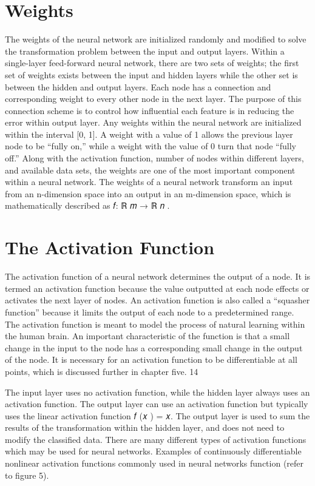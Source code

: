 \documentclass[../main.tex]{subfiles}
\begin{document}
    \section{Weights}\label{sec:weights}
    The weights of the neural network are initialized randomly and modified to solve the transformation problem between the input and output layers.
    Within a single-layer feed-forward neural network, there are two sets of weights; the first set of weights exists between the input and hidden layers while the other set is between the hidden and output layers.
    Each node has a connection and corresponding weight to every other node in the next layer.
    The purpose of this connection scheme is to control how influential each feature is in reducing the error within output layer.
    Any weights within the neural network are initialized within the interval [0, 1].
    A weight with a value of 1 allows the previous layer node to be “fully on,” while a weight with the value of 0 turn that node “fully off.” Along with the activation function, number of nodes within different layers, and available data sets, the weights are one of the most important component within a neural network.
    The weights of a neural network transform an input from an n-dimension space into an output in an m-dimension space, which is mathematically described as 𝑓: ℝ 𝑚 → ℝ 𝑛 .

    \section{The Activation Function}\label{sec:the-activation-function}
    The activation function of a neural network determines the output of a node.
    It is termed an activation function because the value outputted at each node effects or activates the next layer of nodes.
    An activation function is also called a “squasher function” because it limits the output of each node to a predetermined range.
    The activation function is meant to model the process of natural learning within the human brain.
    An important characteristic of the function is that a small change in the input to the node has a corresponding small change in the output of the node.
    It is necessary for an activation function to be differentiable at all points, which is discussed further in chapter five. 14

    The input layer uses no activation function, while the hidden layer always uses an activation function.
    The output layer can use an activation function but typically uses the linear activation function 𝑓 (𝑥 ) = 𝑥.
    The output layer is used to sum the results of the transformation within the hidden layer, and does not need to modify the classified data.
    There are many different types of activation functions which may be used for neural networks.
    Examples of continuously differentiable nonlinear activation functions commonly used in neural networks function (refer to figure 5).
\end{document}
